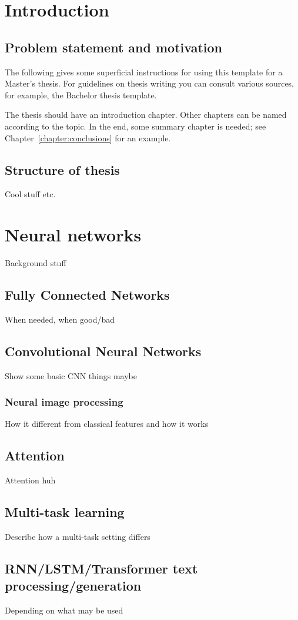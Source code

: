 \chapter{Introduction}
\section{Problem statement and motivation}
The following gives some superficial instructions for using this template for a Master's thesis. For guidelines on thesis writing you can consult various sources, for example, the Bachelor thesis template.

The thesis should have an introduction chapter. Other chapters can be named according to the topic. In the end, some summary chapter is needed; see Chapter~\ref{chapter:conclusions} for an example.

\section{Structure of thesis}
Cool stuff etc.

\chapter{Neural networks}
Background stuff 
\section{Fully Connected Networks}
When needed, when good/bad
\section{Convolutional Neural Networks}
Show some basic CNN things maybe
\subsection{Neural image processing}
How it different from classical features and how it works
\section{Attention}
Attention huh
\section{Multi-task learning}
Describe how a multi-task setting differs
\section{RNN/LSTM/Transformer text processing/generation}
Depending on what may be used


